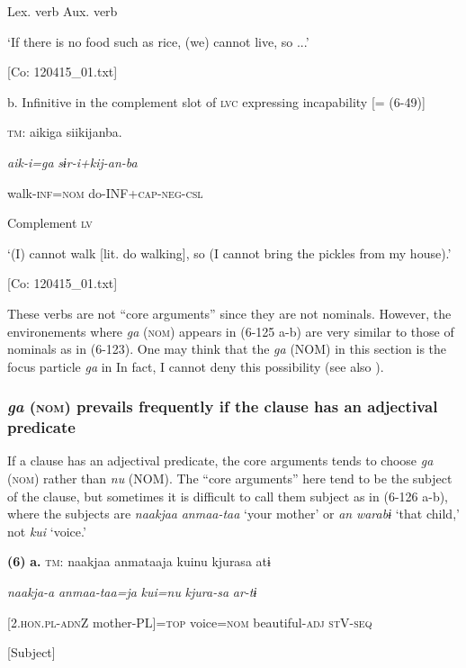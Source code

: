         Lex. verb  Aux. verb

    ‘If there is no food such as rice, (we) cannot live, so ...’

    [Co: 120415\_01.txt]

  b. Infinitive in the complement slot of \textsc{lvc} expressing incapability [= (6-49)]

  \textsc{tm}:  aikiga  siikijanba.

    \textit{aik-i=ga}  \textit{sɨr-i+kij-an{}-ba}

    walk-\textsc{inf}=\textsc{nom}  do-INF+\textsc{cap}-\textsc{neg}-\textsc{csl}

    Complement  \textsc{lv}

    ‘(I) cannot walk [lit. do walking], so (I cannot bring the pickles from my house).’

  [Co: 120415\_01.txt]

These verbs are not “core arguments” since they are not nominals. However, the environements where \textit{ga} (\textsc{nom}) appears in (6-125 a-b) are very similar to those of nominals as in (6-123). One may think that the \textit{ga} (NOM) in this section is the focus particle \textit{ga} in  In fact, I cannot deny this possibility (see also ).

\subsubsection{\textit{ga} (\textsc{nom}) prevails frequently if the clause has an adjectival predicate}

If a clause has an adjectival predicate, the core arguments tends to choose \textit{ga} (\textsc{nom}) rather than \textit{nu} (NOM). The “core arguments” here tend to be the subject of the clause, but sometimes it is difficult to call them subject as in (6-126 a-b), where the subjects are \textit{naakjaa} \textit{anmaa-taa} ‘your mother’ or \textit{an} \textit{warabɨ} ‘that child,’ not \textit{kui} ‘voice.’

\textbf{(6)}  \textbf{a.}  \textsc{tm}:  naakjaa  anmataaja  kuinu  kjurasa  atɨ

      \textit{naakja-a}  \textit{anmaa-taa=ja}  \textit{kui=nu}  \textit{kjura-sa}  \textit{ar-tɨ}

      [2.\textsc{hon}.\textsc{pl}-\textsc{adn}Z  mother-PL]=\textsc{top}  voice=\textsc{nom}  beautiful-\textsc{adj}  \textsc{st}V-\textsc{seq}

      [Subject]      

